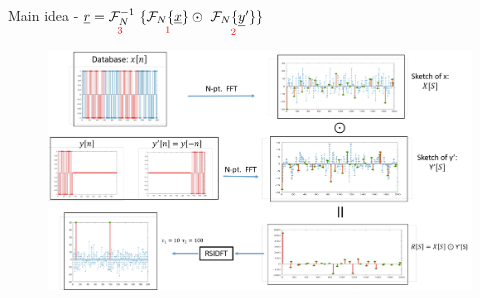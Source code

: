 \documentclass[10pt,xcolor=table]{beamer}
\newcommand{\xv}{\underline{x}}
\newcommand{\yv}{\underline{y}}
\newcommand{\rv}{\underline{r}}
\begin{document}
\def\fracty{0.45}
\def\fractx{0.8}
\begin{frame}{Main idea - $\rv = \underset{\text{\color{red} 3 } } {\mathcal{F}_{N}^{-1}} \ \{ \underset{\text{ \color{red} 1 } }{  \mathcal{F}_{N}\{\xv\}}  \odot \ \underset{\text{ \color{red} 2 } }{ \mathcal{F}_{N}\{\yv'\}}  \}$}
	
	\begin{figure}[t]
		\centering
		\includegraphics[width=4.8in]{Example_full_framework.pdf}
	\end{figure}
	

\end{frame}
\end{document}
